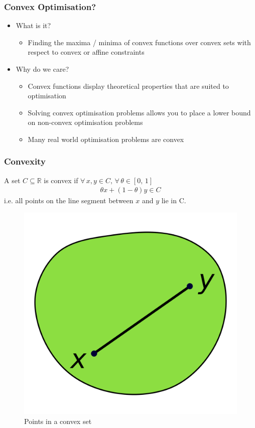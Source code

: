 \documentclass{beamer}
\begin{document}
\begin{frame}
    \frametitle{Convex Optimisation?}
    \begin{itemize}
    \item What is it?
        \begin{itemize}
        \item Finding the maxima / minima of convex functions over convex sets
        with respect to convex or affine constraints
        \end{itemize}
    \item Why do we care?
        \begin{itemize}
            \item Convex functions display theoretical properties that are
                suited to optimisation
            \item Solving convex optimisation problems allows you to place a lower bound
                on non-convex optimisation problems
            \item Many real world optimisation problems are convex
        \end{itemize}
    \end{itemize}
\end{frame}
\begin{frame}
    \frametitle{Convexity}
    A set $C \subseteq \mathbb{R}$ is convex if $\forall \,  x,  y \in C, \,
    \forall \, \theta \in [0, \, 1]$
    \begin{align*}
        \theta x + (1-\theta)y \in C
    \end{align*}
    i.e. all points on the line segment between $x$ and $y$ lie in C.
    \begin{figure}[t]
        \centering
        \includegraphics[scale=0.05]{polygon}
        \caption{Points in a convex set}
        \label{fig:h}
    \end{figure}
\end{frame}
\end{document}
